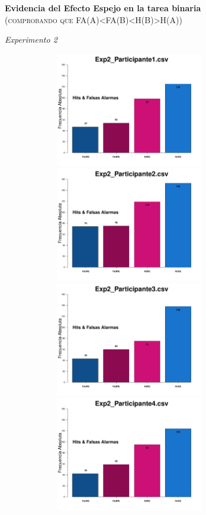 \documentclass[a4paper ]{article}
\begin{document}
\begin{center}
{\LARGE \textbf{Evidencia del Efecto Espejo en la tarea binaria}}\\
{\small \textsc{(comprobando que FA(A)<FA(B)<H(B)>H(A))}}\\
\smallskip
\end{center}
\begin{center}
{\LARGE \textit{Experimento 2}}\\
\end{center}
\vspace{3mm}
\begin{figure}[th]
\centering
\includegraphics[width=9cm, height=5cm]{Figures/MirrorRate_Exp2_P1} \includegraphics[width=9cm, height=5cm]{Figures/MirrorRate_Exp2_P2} 
\includegraphics[width=9cm, height=5cm]{Figures/MirrorRate_Exp2_P3} \includegraphics[width=9cm, height=5cm]{Figures/MirrorRate_Exp2_P4} 

\end{figure}
\end{document}
